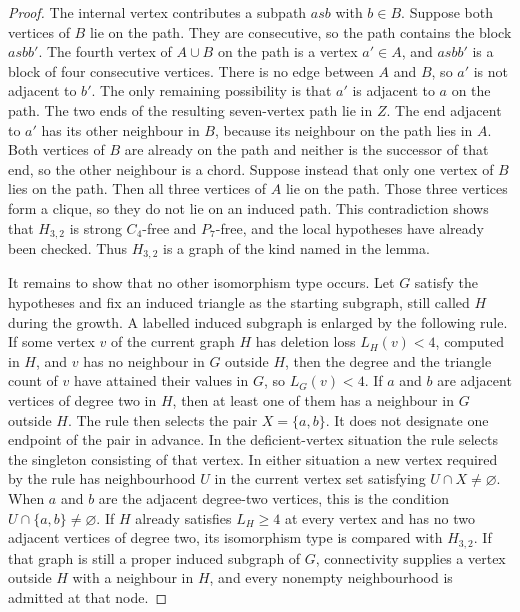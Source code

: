 \documentclass[ASNA]{USG}
\theoremstyle{WBstyletwo}
\numberwithin{equation}{section}
\begin{document}
\begin{proof}
The internal vertex contributes a subpath $asb$ with $b\in B$. Suppose both vertices of $B$ lie on the path. They are consecutive, so the path contains the block $asbb'$. The fourth vertex of $A\cup B$ on the path is a vertex $a'\in A$, and $asbb'$ is a block of four consecutive vertices. There is no edge between $A$ and $B$, so $a'$ is not adjacent to $b'$. The only remaining possibility is that $a'$ is adjacent to $a$ on the path. The two ends of the resulting seven-vertex path lie in $Z$. The end adjacent to $a'$ has its other neighbour in $B$, because its neighbour on the path lies in $A$. Both vertices of $B$ are already on the path and neither is the successor of that end, so the other neighbour is a chord. Suppose instead that only one vertex of $B$ lies on the path. Then all three vertices of $A$ lie on the path. Those three vertices form a clique, so they do not lie on an induced path. This contradiction shows that $H_{3,2}$ is strong $C_4$-free and $P_7$-free, and the local hypotheses have already been checked. Thus $H_{3,2}$ is a graph of the kind named in the lemma.

It remains to show that no other isomorphism type occurs. Let $G$ satisfy the hypotheses and fix an induced triangle as the starting subgraph, still called $H$ during the growth. A labelled induced subgraph is enlarged by the following rule. If some vertex $v$ of the current graph $H$ has deletion loss $L_H(v)<4$, computed in $H$, and $v$ has no neighbour in $G$ outside $H$, then the degree and the triangle count of $v$ have attained their values in $G$, so $L_G(v)<4$. If $a$ and $b$ are adjacent vertices of degree two in $H$, then at least one of them has a neighbour in $G$ outside $H$. The rule then selects the pair $X=\{a,b\}$. It does not designate one endpoint of the pair in advance. In the deficient-vertex situation the rule selects the singleton consisting of that vertex. In either situation a new vertex required by the rule has neighbourhood $U$ in the current vertex set satisfying $U\cap X\neq\varnothing$. When $a$ and $b$ are the adjacent degree-two vertices, this is the condition $U\cap\{a,b\}\neq\varnothing$. If $H$ already satisfies $L_H\ge 4$ at every vertex and has no two adjacent vertices of degree two, its isomorphism type is compared with $H_{3,2}$. If that graph is still a proper induced subgraph of $G$, connectivity supplies a vertex outside $H$ with a neighbour in $H$, and every nonempty neighbourhood is admitted at that node.


\end{proof}
\end{document}
